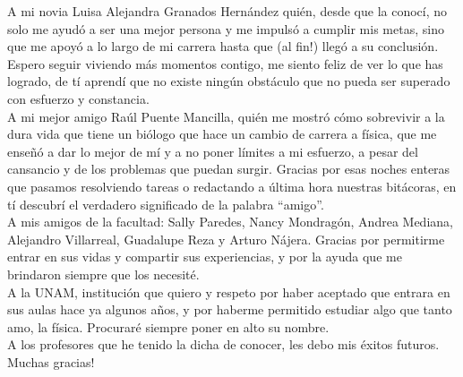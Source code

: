 \documentclass[11pt,twoside,openright,spanish]{report}
\numberwithin{equation}{chapter}
\numberwithin{figure}{chapter}
\numberwithin{table}{chapter}
\begin{document}
\begin{acknowledgements}
\noindent
A mi novia Luisa Alejandra Granados Hernández quién, desde que la conocí, no solo me ayudó a ser una mejor persona y me impulsó a cumplir mis metas, sino que me apoyó a lo largo de mi carrera hasta que (al fin!) llegó a su conclusión. Espero seguir viviendo más momentos contigo, me siento feliz de ver lo que has logrado, de tí aprendí que no existe ningún obstáculo que no pueda ser superado con esfuerzo y constancia.
\\

\noindent
A mi mejor amigo Raúl Puente Mancilla, quién me mostró cómo sobrevivir a la dura vida que tiene un biólogo que hace un cambio de carrera a física, que me enseñó a dar lo mejor de mí y a no poner límites a mi esfuerzo, a pesar del cansancio y de los problemas que puedan surgir. Gracias por esas noches enteras que pasamos resolviendo tareas o redactando a última hora nuestras bitácoras, en tí descubrí el verdadero significado de la palabra ``amigo''.   
\\

\noindent
A mis amigos de la facultad: Sally Paredes, Nancy Mondragón, Andrea Mediana, Alejandro Villarreal, Guadalupe Reza y Arturo Nájera. Gracias por permitirme entrar en sus vidas y compartir sus experiencias, y por la ayuda que me brindaron siempre que los necesité.
\\

\noindent
A la UNAM, institución que quiero y respeto por haber aceptado que entrara en sus aulas hace ya algunos años, y por haberme permitido estudiar algo que tanto amo, la física. Procuraré siempre poner en alto su nombre.
\\

\noindent
A los profesores que he tenido la dicha de conocer, les debo mis éxitos futuros. Muchas gracias!
\\


\end{acknowledgements}


\tableofcontents


\addtolength{\headheight}{\baselineskip}
\pagestyle{fancy}
\cleardoublepage
\end{document}
